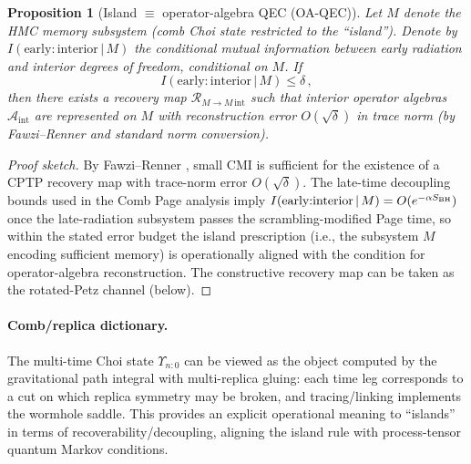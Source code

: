 \documentclass[a4paper,11pt]{article}
\newcommand{\ie}{i.e.\xspace}
\newcommand{\HMC}{\textup{\textsc{HMC}}\xspace}
\theoremstyle{plain}
\newtheorem{proposition}{Proposition}
\theoremstyle{definition}
\theoremstyle{remark}
\begin{document}
\begin{proposition}[Island $\equiv$ operator-algebra QEC (OA-QEC)]
\label{prop:island-oa-qec}
Let $M$ denote the \HMC{} memory subsystem (comb Choi state restricted to the ``island''). Denote by $I(\text{early}{:}\text{interior}\,|\,M)$ the conditional mutual information between early radiation and interior degrees of freedom, conditional on $M$.
If 
\[
I(\text{early}{:}\text{interior}\,|\,M)\leq \delta\,,
\]
then there exists a recovery map $\mathcal{R}_{M\to M\,\text{int}}$ such that interior operator algebras $\mathcal{A}_{\text{int}}$ are represented on $M$ with reconstruction error $O(\sqrt{\delta})$ in trace norm (by Fawzi--Renner and standard norm conversion).
\end{proposition}
\begin{proof}[Proof sketch]
By Fawzi--Renner \cite{FawziRenner:2015}, small CMI is sufficient for the existence of a CPTP recovery map with trace-norm error $O(\sqrt{\delta})$. 
The late-time decoupling bounds used in the Comb Page analysis imply $I(\text{early}{:}\text{interior}\,|\,M)=O(e^{-\alpha S_{\rm BH}})$ once the late-radiation subsystem passes the scrambling-modified Page time, so within the stated error budget the island prescription (\ie, the subsystem $M$ encoding sufficient memory) is operationally aligned with the condition for operator-algebra reconstruction.
The constructive recovery map can be taken as the rotated-Petz channel (below).
\end{proof}

\paragraph{Comb/replica dictionary.}
The multi-time Choi state $\Upsilon_{n{:}0}$ can be viewed as the object computed by the gravitational path integral with multi-replica gluing:
each time leg corresponds to a cut on which replica symmetry may be broken, and tracing/linking implements the wormhole saddle.
This provides an explicit operational meaning to ``islands'' in terms of recoverability/decoupling, aligning the island rule with process-tensor quantum Markov conditions.
\end{document}

